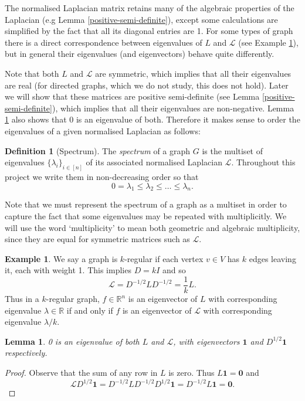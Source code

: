 \documentclass[a4paper,11pt]{article}
\newtheorem{lemma}[theorem]{Lemma}
\theoremstyle{definition}
\newtheorem{definition}[theorem]{Definition}
\newtheorem{example}[theorem]{Example}
\newcommand{\R}{\mathbb{R}}
\renewcommand{\L}{\mathcal{L}}
\begin{document}
The normalised Laplacian matrix retains many of the algebraic properties of the Laplacian (e.g Lemma \ref{positive-semi-definite}), except some calculations are simplified by the fact that all its diagonal entries are 1. For some types of graph there is a direct correspondence between eigenvalues of $L$ and $\L$ (see Example \ref{ex-regular}), but in general their eigenvalues (and eigenvectors) behave quite differently.

\medskip

Note that both $L$ and $\L$ are symmetric, which implies that all their eigenvalues are real (for directed graphs, which we do not study, this does not hold). Later we will show that these matrices are positive semi-definite (see Lemma \ref{positive-semi-definite}), which implies that all their eigenvalues are non-negative. Lemma \ref{zero-eigenvalue} also shows that 0 is an eigenvalue of both. Therefore it makes sense to order the eigenvalues of a given normalised Laplacian as follows:

\begin{definition}[Spectrum]The \emph{spectrum} of a graph $G$ is the multiset of eigenvalues $\{\lambda_i\}_{i \in [n]}$ of its associated normalised Laplacian $\L$. Throughout this project we write them in non-decreasing order so that \[0 = \lambda_1 \le \lambda_2 \le \ldots \le \lambda_n.\]\end{definition}

Note that we must represent the spectrum of a graph as a multiset in order to capture the fact that some eigenvalues may be repeated with multiplicitly. We will use the word `multiplicity' to mean both geometric and algebraic multiplicity, since they are equal for symmetric matrices such as $\L$.

\begin{example}\label{ex-regular}
We say a graph is $k$-regular if each vertex $v \in V$ has $k$ edges leaving it, each with weight 1. This implies $D = kI$ and so
\[
\L = D^{-1/2}LD^{-1/2} = \frac{1}{k}L.
\]
Thus in a $k$-regular graph, $f \in \R^n$ is an eigenvector of $L$ with corresponding eigenvalue $\lambda \in \R$ if and only if $f$ is an eigenvector of $\L$ with corresponding eigenvalue $\lambda / k$.
\end{example}

\begin{lemma}\label{zero-eigenvalue}
0 is an eigenvalue of both $L$ and $\L$, with eigenvectors $\bm{1}$ and $D^{1/2}\bm{1}$ respectively.
\end{lemma}
\begin{proof}
Observe that the sum of any row in $L$ is zero. Thus $L \bm{1} = \bm{0}$ and \[\L D^{1/2}\bm{1} = D^{-1/2}LD^{-1/2}D^{1/2}\bm{1} = D^{-1/2}L\bm{1} = \bm{0}.\]
\end{proof}
\end{document}
